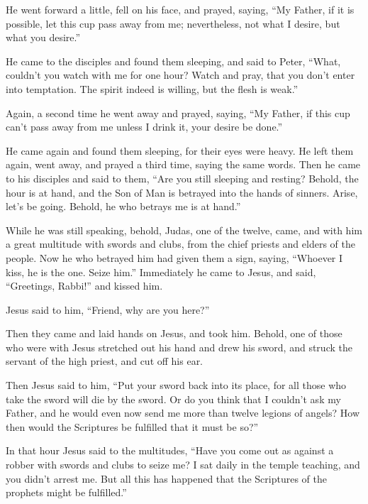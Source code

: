  He went forward a little, fell on his face, and prayed,
saying, ``My Father, if it is possible, let this cup pass away from me;
nevertheless, not what I desire, but what you desire.''

 He came to the disciples and found them sleeping, and
said to Peter, ``What, couldn't you watch with me for one hour?
 Watch and pray, that you don't enter into temptation.
The spirit indeed is willing, but the flesh is weak.''

 Again, a second time he went away and prayed, saying,
``My Father, if this cup can't pass away from me unless I drink it, your
desire be done.''

 He came again and found them sleeping, for their eyes
were heavy.  He left them again, went away, and prayed a
third time, saying the same words.  Then he came to his
disciples and said to them, ``Are you still sleeping and resting?
Behold, the hour is at hand, and the Son of Man is betrayed into the
hands of sinners.  Arise, let's be going. Behold, he who
betrays me is at hand.''

 While he was still speaking, behold, Judas, one of the
twelve, came, and with him a great multitude with swords and clubs, from
the chief priests and elders of the people.  Now he who
betrayed him had given them a sign, saying, ``Whoever I kiss, he is the
one. Seize him.''  Immediately he came to Jesus, and
said, ``Greetings, Rabbi!'' and kissed him.

 Jesus said to him, ``Friend, why are you here?''

Then they came and laid hands on Jesus, and took him. 
Behold, one of those who were with Jesus stretched out his hand and drew
his sword, and struck the servant of the high priest, and cut off his
ear.

 Then Jesus said to him, ``Put your sword back into its
place, for all those who take the sword will die by the sword.
 Or do you think that I couldn't ask my Father, and he
would even now send me more than twelve legions of angels?
 How then would the Scriptures be fulfilled that it must
be so?''

 In that hour Jesus said to the multitudes, ``Have you
come out as against a robber with swords and clubs to seize me? I sat
daily in the temple teaching, and you didn't arrest me. 
But all this has happened that the Scriptures of the prophets might be
fulfilled.''

